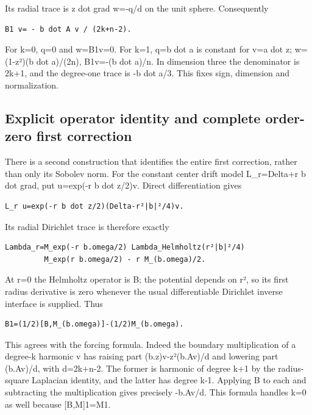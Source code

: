 \documentclass[11pt]{article}
\theoremstyle{definition}
\theoremstyle{remark}
\numberwithin{equation}{section}
\begin{document}
Its radial trace is z dot grad w=-q/d on the unit sphere. Consequently

\begin{verbatim}
B1 v= - b dot A v / (2k+n-2).
\end{verbatim}

For k=0, q=0 and w=B1v=0. For k=1, q=b dot a is constant for v=a dot z;
w=(1-\textbar z\textbar²)(b dot a)/(2n), B1v=-(b dot a)/n. In dimension
three the denominator is 2k+1, and the degree-one trace is -b dot a/3.
This fixes sign, dimension and normalization.

\hypertarget{source-bf1ada3d0e91-explicit-operator-identity-and-complete-order-zero-first-correction}{%
\subsection{Explicit operator identity and complete order-zero first
correction}\label{source-bf1ada3d0e91-explicit-operator-identity-and-complete-order-zero-first-correction}}

There is a second construction that identifies the entire first
correction, rather than only its Sobolev norm. For the constant center
drift model L\_r=Delta+r b dot grad, put u=exp(-r b dot z/2)v. Direct
differentiation gives

\begin{verbatim}
L_r u=exp(-r b dot z/2)(Delta-r²|b|²/4)v.
\end{verbatim}

Its radial Dirichlet trace is therefore exactly

\begin{verbatim}
Lambda_r=M_exp(-r b.omega/2) Lambda_Helmholtz(r²|b|²/4)
         M_exp(r b.omega/2) - r M_(b.omega)/2.
\end{verbatim}

At r=0 the Helmholtz operator is B; the potential depends on r², so its
first radius derivative is zero whenever the usual differentiable
Dirichlet inverse interface is supplied. Thus

\begin{verbatim}
B1=(1/2)[B,M_(b.omega)]-(1/2)M_(b.omega).
\end{verbatim}

This agrees with the forcing formula. Indeed the boundary multiplication
of a degree-k harmonic v has raising part
(b.z)v-\textbar z\textbar²(b.Av)/d and lowering part (b.Av)/d, with
d=2k+n-2. The former is harmonic of degree k+1 by the radius-square
Laplacian identity, and the latter has degree k-1. Applying B to each
and subtracting the multiplication gives precisely -b.Av/d. This formula
handles k=0 as well because {[}B,M{]}1=M1.
\end{document}
